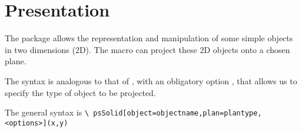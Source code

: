 \section{Presentation}


The package allows the representation and manipulation of some
simple objects in two dimensions (2D). The macro 
can project these 2D objects onto a chosen plane.

The syntax is analogous to that of , with an
obligatory option , that allows us to specify
the type of object to be projected.

The general syntax is \texttt{\textbackslash
psSolid[object=objectname,plan=plantype,<options>](x,y)}

\endinput
